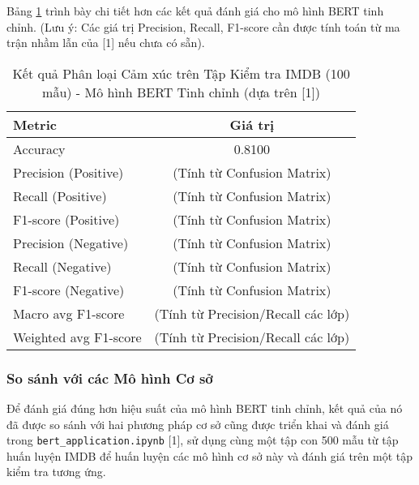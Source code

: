 \begin{itemize}
    Bảng \ref{tab:imdb_results_finetuned_bert_rewrite} trình bày chi tiết hơn các kết quả đánh giá cho mô hình BERT tinh chỉnh. (Lưu ý: Các giá trị Precision, Recall, F1-score cần được tính toán từ ma trận nhầm lẫn của [1] nếu chưa có sẵn).

    \begin{table}[H]
        \centering
        \caption{Kết quả Phân loại Cảm xúc trên Tập Kiểm tra IMDB (100 mẫu) - Mô hình BERT Tinh chỉnh (dựa trên [1])}
        \label{tab:imdb_results_finetuned_bert_rewrite}
        \begin{tabular}{lc}
            \toprule
            \textbf{Metric} & \textbf{Giá trị} \\
            \midrule
            Accuracy & 0.8100 \\
            Precision (Positive) & (Tính từ Confusion Matrix) \\
            Recall (Positive) & (Tính từ Confusion Matrix) \\
            F1-score (Positive) & (Tính từ Confusion Matrix) \\
            Precision (Negative) & (Tính từ Confusion Matrix) \\
            Recall (Negative) & (Tính từ Confusion Matrix) \\
            F1-score (Negative) & (Tính từ Confusion Matrix) \\
            \midrule
            Macro avg F1-score & (Tính từ Precision/Recall các lớp) \\
            Weighted avg F1-score & (Tính từ Precision/Recall các lớp) \\
            \bottomrule
        \end{tabular}
    \end{table}
\end{itemize}

\subsubsection{So sánh với các Mô hình Cơ sở}
\label{sssec:so_sanh_voi_mo_hinh_co_so_rewrite}
Để đánh giá đúng hơn hiệu suất của mô hình BERT tinh chỉnh, kết quả của nó đã được so sánh với hai phương pháp cơ sở cũng được triển khai và đánh giá trong \texttt{bert\_application.ipynb} [1], sử dụng cùng một tập con 500 mẫu từ tập huấn luyện IMDB để huấn luyện các mô hình cơ sở này và đánh giá trên một tập kiểm tra tương ứng.

